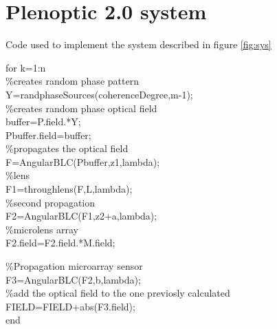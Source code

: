 \section*{Plenoptic 2.0 system}
Code used to implement the system described in figure  \ref{fig:sys}
\begin{listing}
for k=1:n\\
\%creates random phase pattern\\
Y=randphaseSources(coherenceDegree,m-1);\\

\%creates random phase optical field\\
buffer=P.field.*Y;\\
Pbuffer.field=buffer;\\

\%propagates the optical field\\
F=AngularBLC(Pbuffer,z1,lambda);\\

\%lens \\
F1=throughlens(F,L,lambda);\\

\%second propagation\\
F2=AngularBLC(F1,z2+a,lambda);\\

\%microlens array\\
F2.field=F2.field.*M.field;

\%Propagation microarray sensor\\
F3=AngularBLC(F2,b,lambda);\\

\%add the optical field to the one previosly calculated\\
FIELD=FIELD+abs(F3.field);\\
end	\\
\end{listing}
